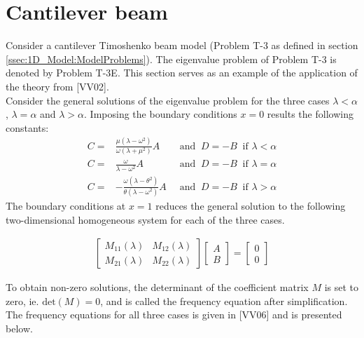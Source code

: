 \documentclass[../../main.tex]{subfiles}
\begin{document}
\section{Cantilever beam} \label{sec:Timo:Cantilever}
Consider a cantilever Timoshenko beam model (Problem T-3 as defined in section \ref{ssec:1D_Model:ModelProblems}). The eigenvalue problem of Problem T-3 is denoted by Problem T-3E. This section serves as an example of the application of the theory from [VV02].\\

Consider the general solutions of the eigenvalue problem for the three cases $\lambda < \alpha$, $\lambda = \alpha$ and $\lambda > \alpha$. Imposing the boundary conditions $x = 0$ results the following constants:
\begin{align}
	C = & \frac{\mu(\lambda-\omega^2)}{\omega(\lambda+\mu^2)}A  \  &\textrm{ and } \ D = -B  \ \textrm{ if } \lambda < \alpha \label{A1}\\
	C = & \frac{\omega}{\lambda - \omega^2}A  \  &\textrm{ and } \ D = -B  \ \textrm{ if } \lambda = \alpha \label{A2}\\
	C = & -\frac{\omega(\lambda-\theta^2)}{\theta(\lambda-\omega^2)}A  \  &\textrm{ and } \ D = -B  \ \textrm{ if } \lambda > \alpha \label{A3}
\end{align}
The boundary conditions at $x = 1$ reduces the general solution to the following two-dimensional homogeneous system for each of the three cases.

\begin{align}
	\begin{bmatrix}
		M_{11}(\lambda) & M_{12}(\lambda)\\
		M_{21}(\lambda) & M_{22}(\lambda)
	\end{bmatrix}
	\begin{bmatrix}
		A\\
		B
	\end{bmatrix}
	= 
	\begin{bmatrix}
		0\\
		0
	\end{bmatrix}
\label{eq:Timo:Cantilever:SystemOfEquations}
\end{align}

To obtain non-zero solutions, the determinant of the coefficient matrix $M$ is set to zero, ie. $\textrm{det}(M) = 0$, and is called the frequency equation after simplification. The frequency equations for all three cases is given in [VV06] and is presented below.\\
\end{document}
